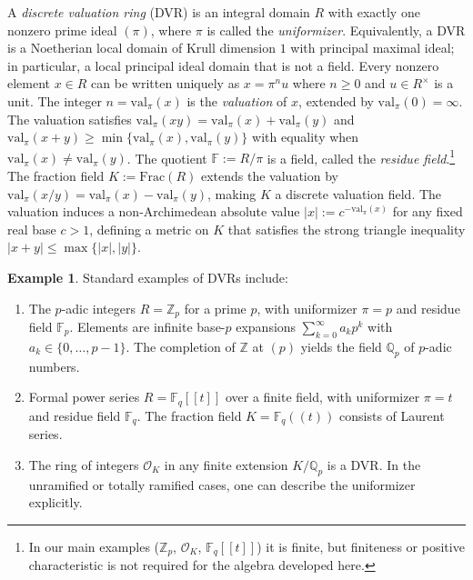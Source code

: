 \documentclass[11pt]{amsart}
\theoremstyle{plain}
\theoremstyle{definition}
\newtheorem{example}[theorem]{Example}
\newcommand{\Zp}{\mathbb{Z}_p}                        %
\newcommand{\Qp}{\mathbb{Q}_p}                        %
\newcommand{\valpi}{\mathrm{val}_{\unif}}                   %
\newcommand{\Ring}{R}                          %
\newcommand{\unif}{\pi}                        %
\begin{document}
A \emph{discrete valuation ring} (DVR) is an integral domain $\Ring$ with exactly one nonzero prime ideal $(\unif)$, where $\unif$ is called the \emph{uniformizer}. Equivalently, a DVR is a Noetherian local domain of Krull dimension $1$ with principal maximal ideal; in particular, a local principal ideal domain that is not a field.
Every nonzero element $x \in \Ring$ can be written uniquely as $x = \unif^n u$ where $n \ge 0$ and $u \in \Ring^\times$ is a unit. The integer $n = \valpi(x)$ is the \emph{valuation} of $x$, extended by $\valpi(0) = \infty$. The valuation satisfies $\valpi(xy) = \valpi(x) + \valpi(y)$ and $\valpi(x+y) \ge \min\{\valpi(x), \valpi(y)\}$ with equality when $\valpi(x) \neq \valpi(y)$.
The quotient $\mathbb{F} := \Ring/\unif$ is a field, called the \emph{residue field}.\footnote{In our main examples ($\Zp$, $\mathcal{O}_K$, $\mathbb{F}_q[[t]]$) it is finite, but finiteness or positive characteristic is not required for the algebra developed here.}
The fraction field $K := \mathrm{Frac}(\Ring)$ extends the valuation by $\valpi(x/y) = \valpi(x) - \valpi(y)$, making $K$ a discrete valuation field. 
The valuation induces a non-Archimedean absolute value $|x| := c^{-\valpi(x)}$ for any fixed real base $c>1$, defining a metric on $K$ that satisfies the strong triangle inequality $|x+y| \le \max\{|x|,|y|\}$.

\begin{example}
\label{ex:dvr-examples}
Standard examples of DVRs include:
\begin{enumerate}[label=\textup{(\roman*)}]
\item The $p$-adic integers $\Ring = \Zp$ for a prime $p$, with uniformizer $\unif = p$ and residue field $\mathbb{F}_p$. Elements are infinite base-$p$ expansions $\sum_{k=0}^\infty a_k p^k$ with $a_k \in \{0,\ldots,p-1\}$. The completion of $\mathbb{Z}$ at $(p)$ yields the field $\Qp$ of $p$-adic numbers.

\item Formal power series $\Ring = \mathbb{F}_q[[t]]$ over a finite field, with uniformizer $\unif = t$ and residue field $\mathbb{F}_q$. The fraction field $K = \mathbb{F}_q((t))$ consists of Laurent series.

\item The ring of integers $\mathcal{O}_K$ in any finite extension $K/\Qp$ is a DVR. In the unramified or totally ramified cases, one can describe the uniformizer explicitly.
\end{enumerate}
\end{example}
\end{document}
